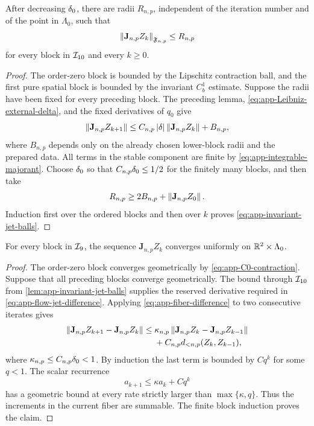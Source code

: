 \begin{lemma}
\label{lem:app-invariant-jet-balls}
After decreasing \(\delta_0\), there are radii \(R_{n,p}\), independent of
the iteration number and of the point in \(\Lambda_0\), such that
\begin{equation}
\label{eq:app-invariant-jet-balls}
 \left\lVert \mathbf J_{n,p}Z_k\right\rVert_{\mathfrak F_{n,p}}
 \leq R_{n,p}
\end{equation}
for every block in \(\mathcal I_{10}\) and every \(k\geq0\).
\end{lemma}

\begin{proof}
The order-zero block is bounded by the Lipschitz contraction ball, and the
first pure spatial block is bounded by the invariant \(C_b^1\) estimate.
Suppose the radii have been fixed for every preceding block.  The preceding
lemma, \cref{eq:app-Leibniz-external-delta}, and the fixed derivatives of
\(q_0\) give
\begin{equation}
\label{eq:app-invariant-recurrence}
 \left\lVert \mathbf J_{n,p}Z_{k+1}\right\rVert
 \leq C_{n,p}\left\lvert \delta\right\rvert
       \left\lVert \mathbf J_{n,p}Z_k\right\rVert+B_{n,p},
\end{equation}
where \(B_{n,p}\) depends only on the already chosen lower-block radii and
the prepared data.  All terms in the stable component are finite by
\cref{eq:app-integrable-majorant}.  Choose \(\delta_0\) so that
\(C_{n,p}\delta_0\leq1/2\) for the finitely many blocks, and then take
\[
 R_{n,p}\geq
 2B_{n,p}+\left\lVert \mathbf J_{n,p}Z_0\right\rVert.
\]
Induction first over the ordered blocks and then over \(k\) proves
\cref{eq:app-invariant-jet-balls}.
\end{proof}

\begin{lemma}
\label{lem:app-mixed-jet-convergence}
For every block in \(\mathcal I_9\), the sequence
\(\mathbf J_{n,p}Z_k\) converges uniformly on
\(\mathbb R^2\times\Lambda_0\).
\end{lemma}

\begin{proof}
The order-zero block converges geometrically by
\cref{eq:app-C0-contraction}.  Suppose that all preceding blocks converge
geometrically.  The bound through \(\mathcal I_{10}\) from
\cref{lem:app-invariant-jet-balls} supplies the reserved derivative required
in \cref{eq:app-flow-jet-difference}.  Applying
\cref{eq:app-fiber-difference} to two consecutive iterates gives
\begin{align}
\label{eq:app-fiber-increment-recurrence}
 \left\lVert \mathbf J_{n,p}Z_{k+1}-\mathbf J_{n,p}Z_k\right\rVert
 \leq{}&\kappa_{n,p}
 \left\lVert \mathbf J_{n,p}Z_k-\mathbf J_{n,p}Z_{k-1}\right\rVert\notag\\
 &+C_{n,p}d_{<n,p}(Z_k,Z_{k-1}),
\end{align}
where \(\kappa_{n,p}\leq C_{n,p}\delta_0<1\).  By induction the last term is
bounded by \(Cq^k\) for some \(q<1\).  The scalar recurrence
\[
 a_{k+1}\leq\kappa a_k+Cq^k
\]
has a geometric bound at every rate strictly larger than
\(\max\{\kappa,q\}\).  Thus the increments in the current fiber are
summable.  The finite block induction proves the claim.
\end{proof}

